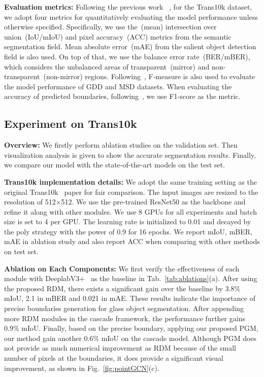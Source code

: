 \noindent \textbf{Evaluation metrics:} Following the previous work~\cite{trans10k_xieenze, tranparent_gdnet, Mirror_net} , for the Trans10k dataset, we adopt four metrics for quantitatively evaluating the model performance unless otherwise specified. Specifically, we use the~(mean) intersection over union~(IoU/mIoU) and pixel accuracy~(ACC) metrics from the semantic segmentation field. Mean absolute error~(mAE) from the salient object detection field is also used. On top of that, we use the balance error rate~(BER/mBER), which considers the unbalanced areas of transparent~(mirror) and non-transparent~(non-mirror) regions. Following~\cite{tranparent_gdnet, Mirror_net}, F-measure is also used to evaluate the model performance of GDD and MSD datasets. When evaluating the accuracy of predicted boundaries, following~\cite{gated-scnn}, we use F1-score as the metric.

\subsection{Experiment on Trans10k}

\noindent \textbf{Overview:} We firstly perform ablation studies on the validation set. Then visualization analysis is given to show the accurate segmentation results. Finally, we compare our model with the state-of-the-art models on the test set.

\noindent \textbf{Trans10k implementation details:} \iffalse We implement our method using  Pytorch~\cite{pytorch} \fi We adopt the same training setting as the original Trans10k~\cite{trans10k_xieenze} paper for fair comparison. The input images are resized to the resolution of 512$\times$512. We use the pre-trained ResNet50 as the backbone and refine it along with other modules. We use 8 GPUs for all experiments and batch size is set to 4 per GPU. The learning rate is initialized to 0.01 and decayed by the poly strategy with the power of 0.9 for 16 epochs. We report mIoU, mBER, mAE in ablation study and also report ACC when comparing with other methods on test set.

\noindent \textbf{Ablation on Each Components:} We first verify the effectiveness of each module with DeeplabV3+~\cite{deeplabv3p} as the baseline in Tab.~\ref{tab:ablations}(a). After using the proposed RDM, there exists a significant gain over the baseline by 3.8\% mIoU, 2.1 in mBER and 0.021 in mAE. These results indicate the importance of precise boundaries generation for glass object segmentation. After appending more RDM modules in the cascade framework, the performance further gains 0.9\% mIoU. Finally, based on the precise boundary, applying our proposed PGM, our method gain another 0.6\% mIoU on the cascade model. Although PGM does not provide as much numerical improvement as RDM because of the small number of pixels at the boundaries, it does provide a significant visual improvement, as shown in Fig.~\ref{fig:pointGCN}(c). 

